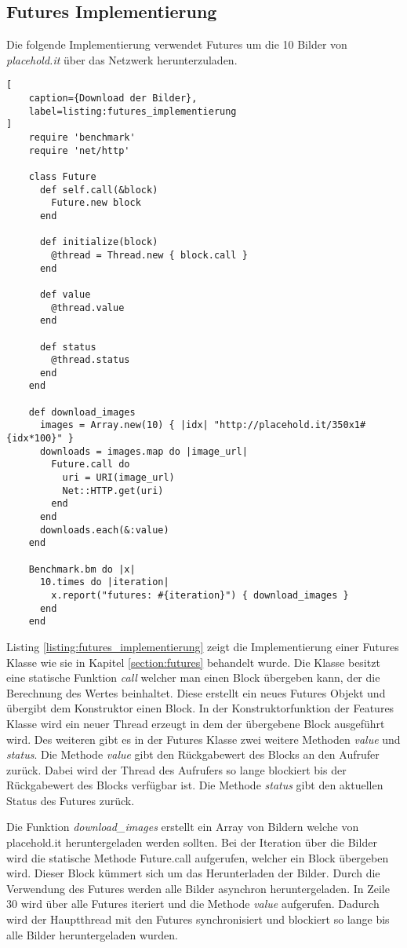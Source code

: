 \subsection{Futures Implementierung}

Die folgende Implementierung verwendet Futures um die 10 Bilder von \emph{placehold.it} über das Netzwerk herunterzuladen.

\begin{lstlisting}[
	caption={Download der Bilder},
	label=listing:futures_implementierung
]
	require 'benchmark'
	require 'net/http'

	class Future
	  def self.call(&block)
	    Future.new block
	  end

	  def initialize(block)
	    @thread = Thread.new { block.call }
	  end

	  def value
	    @thread.value
	  end

	  def status
	    @thread.status
	  end
	end

	def download_images
	  images = Array.new(10) { |idx| "http://placehold.it/350x1#{idx*100}" }
	  downloads = images.map do |image_url|
	    Future.call do
	      uri = URI(image_url)
	      Net::HTTP.get(uri)
	    end
	  end
	  downloads.each(&:value)
	end

	Benchmark.bm do |x|
	  10.times do |iteration|
	    x.report("futures: #{iteration}") { download_images }
	  end
	end
\end{lstlisting}

Listing \ref{listing:futures_implementierung} zeigt die Implementierung einer Futures Klasse wie sie in Kapitel \ref{section:futures} behandelt wurde. Die Klasse besitzt eine statische Funktion \emph{call} welcher man einen Block übergeben kann, der die Berechnung des Wertes beinhaltet. Diese erstellt ein neues Futures Objekt und übergibt dem Konstruktor einen Block. In der Konstruktorfunktion der Features Klasse wird ein neuer Thread erzeugt in dem der übergebene Block ausgeführt wird. Des weiteren gibt es in der Futures Klasse zwei weitere Methoden \emph{value} und \emph{status}. Die Methode \emph{value} gibt den Rückgabewert des Blocks an den Aufrufer zurück. Dabei wird der Thread des Aufrufers so lange blockiert bis der Rückgabewert des Blocks verfügbar ist. Die Methode \emph{status} gibt den aktuellen Status des Futures zurück.

Die Funktion \emph{download\_images} erstellt ein Array von Bildern welche von placehold.it heruntergeladen werden sollten. Bei der Iteration über die Bilder wird die statische Methode Future.call aufgerufen, welcher ein Block übergeben wird. Dieser Block kümmert sich um das Herunterladen der Bilder. Durch die Verwendung des Futures werden alle Bilder asynchron heruntergeladen. In Zeile 30 wird über alle Futures iteriert und die Methode \emph{value} aufgerufen. Dadurch wird der Hauptthread mit den Futures synchronisiert und blockiert so lange bis alle Bilder heruntergeladen wurden. 

